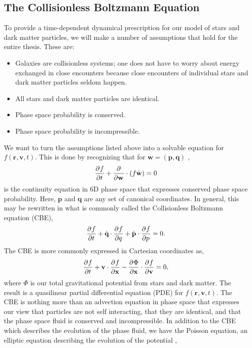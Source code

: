 \subsection{The Collisionless Boltzmann Equation}

To provide a time-dependent dynamical prescription for our model of stars and dark matter particles, we will make a number of assumptions that hold for the entire thesis. These are:

\begin{itemize}
\item Galaxies are collisionless systems; one does not have to worry about energy exchanged in close encounters because close encounters of individual stars and dark matter particles seldom happen.
\item All stars and dark matter particles are identical.
\item Phase space probability is conserved.
\item Phase space probability is incompressible.
\end{itemize}
We want to turn the assumptions listed above into a solvable equation for $f(\textbf{r},\textbf{v},t)$. This is done by recognizing that  for $\textbf{w} = (\textbf{p}, \textbf{q})$ \citep{BT},
\begin{equation}
\frac{\partial^{} {f}}{\partial {t}^{}} + \frac{\partial^{} {}}{\partial {\textbf{w}}^{}} \cdot \left( f \dot{\textbf{w}}\right) = 0
\end{equation}
is the continuity equation in 6D phase space that expresses conserved phase space probability. Here, $\textbf{p}$ and $\textbf{q}$ are any set of canonical coordinates. In general, this may be rewritten in what is commonly called the Collisionless Boltzmann equation (CBE),
\begin{equation}
\frac{\partial^{} {f}}{\partial {t}^{}} + \dot{\textbf{q}} \cdot \frac{\partial^{} {f}}{\partial {q}^{}} + \dot{\textbf{p}} \cdot \frac{\partial^{} {f}}{\partial {p}^{}} = 0.
\end{equation}
The CBE is more commonly expressed in Cartesian coordinates as,
\begin{equation}
\frac{\partial^{} {f}}{\partial {t}^{}} + \textbf{v} \cdot \frac{\partial^{} {f}}{\partial {\textbf{x}}^{}} - \frac{\partial^{} {\Phi}}{\partial {\textbf{x}}^{}} \cdot \frac{\partial^{} {f}}{\partial {\textbf{v}}^{}} = 0, \label{eq:cbe_cartesian}
\end{equation}
where $\Phi$ is our total gravitational potential from stars and dark matter. The result is a quasilinear partial differential equation (PDE) for $f(\textbf{r},\textbf{v},t)$. The CBE is nothing more than an advection equation in phase space that expresses our view that particles are not self interacting, that they are identical, and that the phase space fluid is conserved and incompressible. In addition to the CBE which describes the evolution of the phase fluid, we have the Poisson equation, an elliptic equation describing the evolution of the potential \citep{BT},
